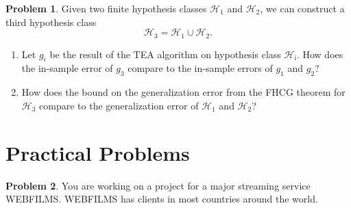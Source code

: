 \documentclass[10pt]{exam}
\theoremstyle{definition}
\newtheorem{problem}{Problem}
\newcommand{\HH}[1]{\mathcal H_{\text{#1}}}
\begin{document}
\newpage
\begin{problem}
    Given two finite hypothesis classes $\HH{1}$ and $\HH{2}$, we can construct a third hypothesis class
    \begin{equation}
        \HH{3} = \HH{1} \cup \HH{2}.
    \end{equation}
    \begin{enumerate}
        \item
            Let $g_i$ be the result of the TEA algorithm on hypothesis class $\HH{i}$.
            How does the in-sample error of $g_3$ compare to the in-sample errors of $g_1$ and $g_2$?

            \vspace{4in}
        \item
            How does the bound on the generalization error from the FHCG theorem for $\HH{3}$ compare to the generalization error of $\HH{1}$ and $\HH{2}$?
    \end{enumerate}
\end{problem}

\newpage
\section{Practical Problems}
\begin{problem}
    You are working on a project for a major streaming service WEBFILMS.
    WEBFILMS has clients in most countries around the world.
\end{problem}
\end{document}

